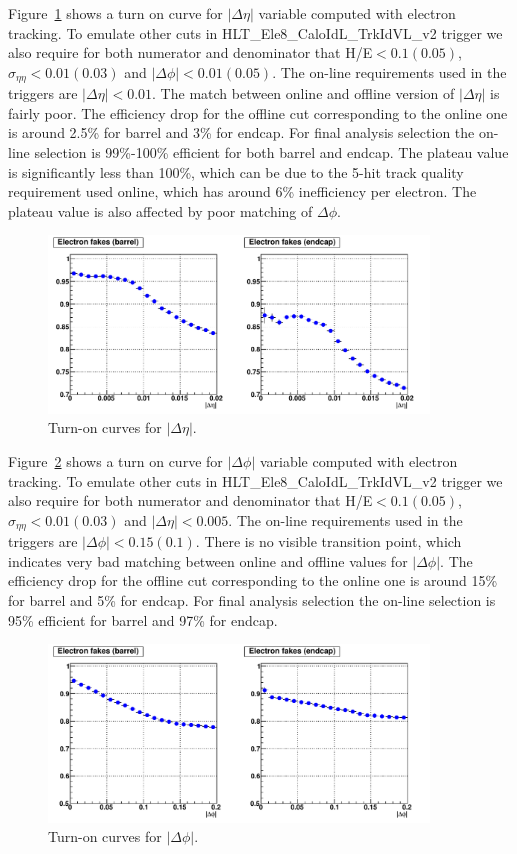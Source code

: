 Figure~\ref{fig:onoff_detain} shows a turn on curve for $|\Delta\eta|$
variable computed with electron tracking. To emulate other cuts in
HLT\_Ele8\_CaloIdL\_TrkIdVL\_v2 trigger we also require for both
numerator and denominator that H/E$<0.1(0.05)$,
$\sigma_{\eta\eta}<0.01(0.03)$ and $|\Delta\phi|<0.01(0.05)$. The
on-line requirements used in the triggers are $|\Delta\eta|<0.01$. The
match between online and offline version of $|\Delta\eta|$ is fairly
poor.  The efficiency drop for the offline cut corresponding to the
online one is around 2.5\% for barrel and 3\% for endcap. For final
analysis selection the on-line selection is 99\%-100\% efficient for
both barrel and endcap. The plateau value is significantly less than
100\%, which can be due to the 5-hit track quality requirement used
online, which has around 6\% inefficiency per electron. The plateau
value is also affected by poor matching of $\Delta\phi$.

\begin{figure}[!htbp]
\begin{center}
   \includegraphics[width=0.9\textwidth]{figures/online_vs_offline_detain.pdf}
   \caption{Turn-on curves for $|\Delta\eta|$.}
   \label{fig:onoff_detain}
\end{center}
\end{figure}

Figure~\ref{fig:onoff_dphiin} shows a turn on curve for $|\Delta\phi|$
variable computed with electron tracking. To emulate other cuts in
HLT\_Ele8\_CaloIdL\_TrkIdVL\_v2 trigger we also require for both
numerator and denominator that H/E$<0.1(0.05)$,
$\sigma_{\eta\eta}<0.01(0.03)$ and $|\Delta\eta|<0.005$. The on-line
requirements used in the triggers are $|\Delta\phi|<0.15(0.1)$. There
is no visible transition point, which indicates very bad matching
between online and offline values for $|\Delta\phi|$. The efficiency
drop for the offline cut corresponding to the online one is around
15\% for barrel and 5\% for endcap. For final analysis selection the
on-line selection is ~ 95\% efficient for barrel and 97\% for
endcap.

\begin{figure}[!htbp]
\begin{center}
   \includegraphics[width=0.9\textwidth]{figures/online_vs_offline_dphiin.pdf}
   \caption{Turn-on curves for $|\Delta\phi|$.}
   \label{fig:onoff_dphiin}
\end{center}
\end{figure}
